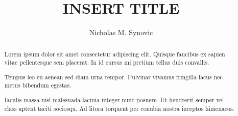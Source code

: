 \documentclass[sigconf,nonacm]{acmart} %
\begin{document}
\title{\textbf{INSERT TITLE}} %


\author{Nicholas M. Synovic}

\renewcommand{\shortauthors}{Synovic}


\begin{abstract}
Lorem ipsum dolor sit amet consectetur adipiscing elit. 
Quisque faucibus ex sapien vitae pellentesque sem placerat. 
In id cursus mi pretium tellus duis convallis. 

Tempus leo eu aenean sed diam urna tempor. 
Pulvinar vivamus fringilla lacus nec metus bibendum egestas. 

Iaculis massa nisl malesuada lacinia integer nunc posuere. 
Ut hendrerit semper vel class aptent taciti sociosqu. 
Ad litora torquent per conubia nostra inceptos himenaeos.
\end{abstract}

\begin{CCSXML}
\end{CCSXML}
\end{document}
